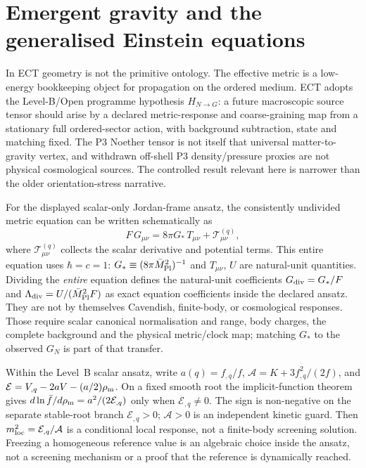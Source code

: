 \documentclass[11pt,a4paper]{article}
\begin{document}
\section{Emergent gravity and the generalised Einstein equations}
\label{sec:pop_gravity}

In ECT geometry is not the primitive ontology.  The effective metric is a
low-energy bookkeeping object for propagation on the ordered medium.  ECT
adopts the Level-B/Open programme hypothesis $H_{N\to G}$: a future
macroscopic source tensor should arise by a declared metric-response and
coarse-graining map from a stationary full ordered-sector action, with
background subtraction, state and matching fixed.  The P3 Noether tensor is
not itself that universal matter-to-gravity vertex, and withdrawn off-shell
P3 density/pressure proxies are not physical cosmological sources.  The
controlled result relevant here is narrower than the older orientation-stress
narrative.

For the displayed scalar-only Jordan-frame ansatz, the consistently undivided metric equation can be written schematically as
\begin{equation}
  F\,G_{\mu\nu}
  = 8\pi G_*\,T_{\mu\nu}
    + \mathcal{T}^{(q)}_{\mu\nu},
  \label{eq:pop_gee}
\end{equation}
where $\mathcal{T}^{(q)}_{\mu\nu}$ collects the scalar derivative and
potential terms.  This entire equation uses $\hbar=c=1$:
$G_*\equiv(8\pi\bar M_{\rm Pl}^2)^{-1}$ and $T_{\mu\nu}$, $U$ are
natural-unit quantities.  Dividing the \emph{entire} equation defines the
natural-unit coefficients $G_{\rm div}=G_*/F$ and
$\Lambda_{\rm div}=U/(\bar M_{\rm Pl}^2F)$ as exact equation coefficients
inside the declared ansatz.  They are not by themselves Cavendish,
finite-body, or cosmological responses.  Those require scalar canonical
normalisation and range, body charges, the complete background and the
physical metric/clock map; matching $G_*$ to the observed $G_N$ is part of
that transfer.

Within the Level~B scalar ansatz, write $a(q)=f_{,q}/f$,
$\mathcal A=K+3f_{,q}^2/(2f)$, and
$\mathcal E=V_{,q}-2aV-(a/2)\rho_{\rm m}$.  On a fixed smooth root the
implicit-function theorem gives
$d\ln\bar f/d\rho_{\rm m}=a^2/(2\mathcal E_{,q})$ only when
$\mathcal E_{,q}\ne0$.  The sign is non-negative on the separate stable-root
branch $\mathcal E_{,q}>0$; $\mathcal A>0$ is an independent kinetic guard.
Then $m_{\rm loc}^2=\mathcal E_{,q}/\mathcal A$ is a conditional local
response, not a finite-body screening solution.  Freezing a homogeneous reference value
is an algebraic choice inside the ansatz, not a screening mechanism or a proof
that the reference is dynamically reached.
\end{document}
